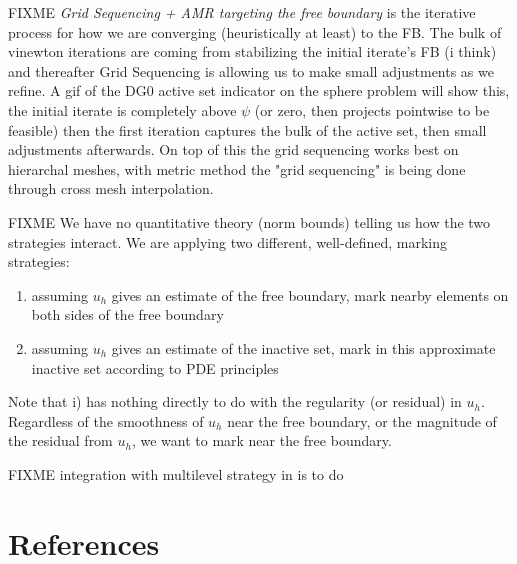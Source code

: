 \documentclass[]{interact}
\theoremstyle{plain}%
\theoremstyle{definition}
\theoremstyle{remark}
\begin{document}
FIXME \emph{Grid Sequencing + AMR targeting the free boundary} is the iterative process for how we are converging (heuristically at least) to the FB.  The bulk of vinewton iterations are coming from stabilizing the initial iterate's FB (i think) and thereafter Grid Sequencing is allowing us to make small adjustments as we refine.  A gif of the DG0 active set indicator on the sphere problem will show this, the initial iterate is completely above $\psi$ (or zero, then  projects pointwise to be feasible) then the first iteration captures the bulk of the active set, then small adjustments afterwards. On top of this the grid sequencing works best on hierarchal meshes, with metric method  the "grid sequencing" is being done through cross mesh interpolation.

FIXME We have no quantitative theory (norm bounds) telling us how the two strategies interact.  We are applying two different, well-defined, marking strategies:
\begin{enumerate}
\item assuming $u_h$ gives an estimate of the free boundary, mark nearby elements on both sides of the free boundary
\item assuming $u_h$ gives an estimate of the inactive set, mark in this approximate inactive set according to PDE principles
\end{enumerate}
Note that i) has nothing directly to do with the regularity (or residual) in $u_h$.  Regardless of the smoothness of $u_h$ near the free boundary, or the magnitude of the residual from $u_h$, we want to mark near the free boundary.

FIXME integration with multilevel strategy in \cite{BuelerFarrell2024} is to do




\section{References}





\end{document}
